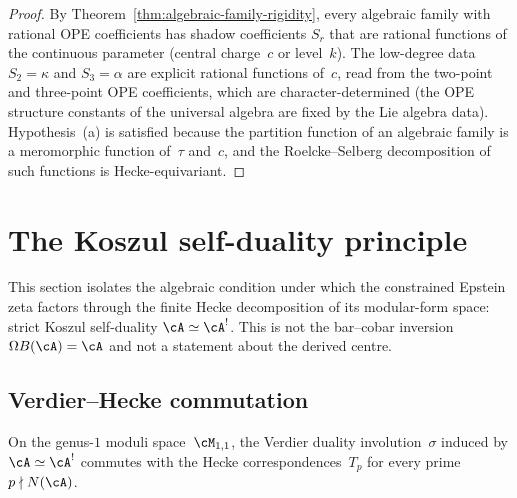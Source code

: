 \begin{proof}
By Theorem~\ref{thm:algebraic-family-rigidity}, every
algebraic family with rational OPE coefficients has shadow
coefficients $S_r$ that are rational functions of the
continuous parameter (central charge~$c$ or level~$k$).
The low-degree data $S_2 = \kappa$ and $S_3 = \alpha$ are
explicit rational functions of~$c$, read from the
two-point and three-point OPE coefficients, which are
character-determined (the OPE structure constants of the
universal algebra are fixed by the Lie algebra data).
Hypothesis~(a) is satisfied because the partition
function of an algebraic family is a meromorphic function
of~$\tau$ and~$c$, and the Roelcke--Selberg decomposition
of such functions is Hecke-equivariant.
\end{proof}

\section{The Koszul self-duality principle}%
\label{sec:koszul-self-duality-principle}%
%

This section isolates the algebraic condition under which the
constrained Epstein zeta factors through the finite Hecke decomposition
of its modular-form space: strict Koszul self-duality
$\cA\simeq\cA^!$. This is not the bar--cobar inversion
$\Omega B(\cA)=\cA$ and not a statement about the derived centre.

\subsection{Verdier--Hecke commutation}

\begin{theorem}%
\label{thm:hecke-verdier-commutation}%
\ClaimStatusProvedHere%
%
%
On the genus-$1$ moduli space~$\cM_{1,1}$, the Verdier
duality involution~$\sigma$ induced by $\cA\simeq\cA^!$
commutes with the Hecke correspondences~$T_p$ for every
prime $p\nmid N(\cA)$.
\end{theorem}

